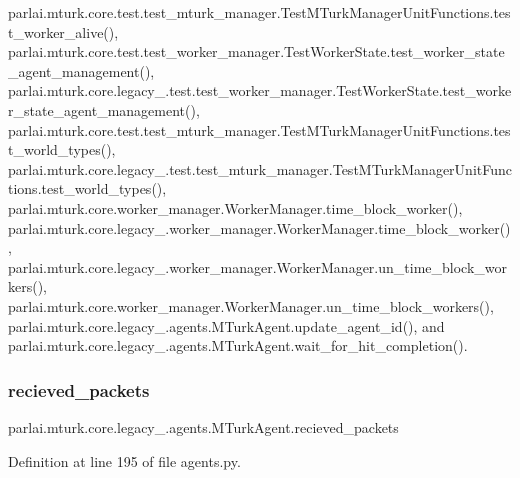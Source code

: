 parlai.\+mturk.\+core.\+test.\+test\+\_\+mturk\+\_\+manager.\+Test\+M\+Turk\+Manager\+Unit\+Functions.\+test\+\_\+worker\+\_\+alive(), parlai.\+mturk.\+core.\+test.\+test\+\_\+worker\+\_\+manager.\+Test\+Worker\+State.\+test\+\_\+worker\+\_\+state\+\_\+agent\+\_\+management(), parlai.\+mturk.\+core.\+legacy\+\_.\+test.\+test\+\_\+worker\+\_\+manager.\+Test\+Worker\+State.\+test\+\_\+worker\+\_\+state\+\_\+agent\+\_\+management(), parlai.\+mturk.\+core.\+test.\+test\+\_\+mturk\+\_\+manager.\+Test\+M\+Turk\+Manager\+Unit\+Functions.\+test\+\_\+world\+\_\+types(), parlai.\+mturk.\+core.\+legacy\+\_.\+test.\+test\+\_\+mturk\+\_\+manager.\+Test\+M\+Turk\+Manager\+Unit\+Functions.\+test\+\_\+world\+\_\+types(), parlai.\+mturk.\+core.\+worker\+\_\+manager.\+Worker\+Manager.\+time\+\_\+block\+\_\+worker(), parlai.\+mturk.\+core.\+legacy\+\_.\+worker\+\_\+manager.\+Worker\+Manager.\+time\+\_\+block\+\_\+worker(), parlai.\+mturk.\+core.\+legacy\+\_.\+worker\+\_\+manager.\+Worker\+Manager.\+un\+\_\+time\+\_\+block\+\_\+workers(), parlai.\+mturk.\+core.\+worker\+\_\+manager.\+Worker\+Manager.\+un\+\_\+time\+\_\+block\+\_\+workers(), parlai.\+mturk.\+core.\+legacy\+\_.\+agents.\+M\+Turk\+Agent.\+update\+\_\+agent\+\_\+id(), and parlai.\+mturk.\+core.\+legacy\+\_.\+agents.\+M\+Turk\+Agent.\+wait\+\_\+for\+\_\+hit\+\_\+completion().

\mbox{\label{classparlai_1_1mturk_1_1core_1_1legacy__2018_1_1agents_1_1MTurkAgent_afd6d5ae5de14541ba1c1d058fe27c0f5}} 
\subsubsection{\texorpdfstring{recieved\+\_\+packets}{recieved\_packets}}
{\footnotesize\ttfamily parlai.\+mturk.\+core.\+legacy\+\_.\+agents.\+M\+Turk\+Agent.\+recieved\+\_\+packets}



Definition at line 195 of file agents.\+py.



